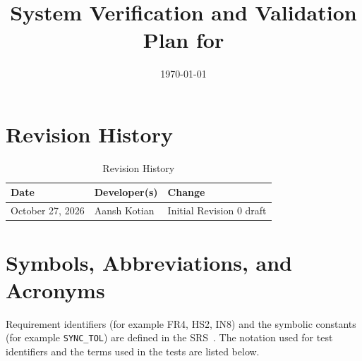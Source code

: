 \documentclass[12pt, titlepage]{article}
\newcommand{\cn}[1]{\texttt{#1}}
\begin{document}
\title{System Verification and Validation Plan for \progname{}} 
\author{\authname}
\date{\today}
	
\maketitle


\section*{Revision History}

\begin{table}[hp]
\caption{Revision History} \label{TblRevisionHistory}
\begin{tabularx}{\textwidth}{llX}
\toprule
\textbf{Date} & \textbf{Developer(s)} & \textbf{Change}\\
\midrule
October 27, 2026 & Aansh Kotian & Initial Revision 0 draft\\
\bottomrule
\end{tabularx}
\end{table}

\newpage

\tableofcontents

\listoftables

\listoffigures

\newpage

\section{Symbols, Abbreviations, and Acronyms}

Requirement identifiers (for example FR4, HS2, IN8) and the symbolic constants
(for example \cn{SYNC\_TOL}) are defined in the SRS~\citep{SRS}. The notation
used for test identifiers and the terms used in the tests are listed below.
\end{document}
